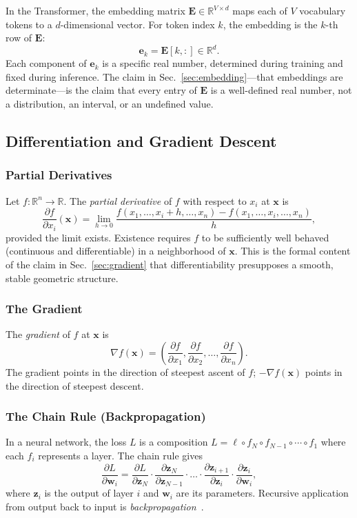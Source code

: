 \documentclass[a4paper,twocolumn,11pt]{article}
\begin{document}
In the Transformer, the embedding matrix $\mathbf{E} \in \mathbb{R}^{V \times d}$ maps each of $V$ vocabulary tokens to a $d$-dimensional vector. For token index $k$, the embedding is the $k$-th row of $\mathbf{E}$:
\[
\mathbf{e}_k = \mathbf{E}[k, :] \in \mathbb{R}^d.
\]
Each component of $\mathbf{e}_k$ is a specific real number, determined during training and fixed during inference. The claim in Sec.~\ref{sec:embedding}---that embeddings are determinate---is the claim that every entry of $\mathbf{E}$ is a well-defined real number, not a distribution, an interval, or an undefined value.

\subsection{Differentiation and Gradient Descent}
\label{sec:A2}

\subsubsection*{Partial Derivatives}

Let $f : \mathbb{R}^n \to \mathbb{R}$. The \emph{partial derivative} of $f$ with respect to $x_i$ at $\mathbf{x}$ is
\[
\frac{\partial f}{\partial x_i}(\mathbf{x}) = \lim_{h \to 0} \frac{f(x_1, \ldots, x_i + h, \ldots, x_n) - f(x_1, \ldots, x_i, \ldots, x_n)}{h},
\]
provided the limit exists. Existence requires $f$ to be sufficiently well behaved (continuous and differentiable) in a neighborhood of $\mathbf{x}$. This is the formal content of the claim in Sec.~\ref{sec:gradient} that differentiability presupposes a smooth, stable geometric structure.

\subsubsection*{The Gradient}

The \emph{gradient} of $f$ at $\mathbf{x}$ is
\[
\nabla f(\mathbf{x}) = \left( \frac{\partial f}{\partial x_1}, \frac{\partial f}{\partial x_2}, \ldots, \frac{\partial f}{\partial x_n} \right).
\]
The gradient points in the direction of steepest ascent of $f$; $-\nabla f(\mathbf{x})$ points in the direction of steepest descent.

\subsubsection*{The Chain Rule (Backpropagation)}

In a neural network, the loss $L$ is a composition $L = \ell \circ f_N \circ f_{N-1} \circ \cdots \circ f_1$ where each $f_i$ represents a layer. The chain rule gives
\[
\frac{\partial L}{\partial \mathbf{w}_i} = \frac{\partial L}{\partial \mathbf{z}_N} \cdot \frac{\partial \mathbf{z}_N}{\partial \mathbf{z}_{N-1}} \cdot \ldots \cdot \frac{\partial \mathbf{z}_{i+1}}{\partial \mathbf{z}_i} \cdot \frac{\partial \mathbf{z}_i}{\partial \mathbf{w}_i},
\]
where $\mathbf{z}_i$ is the output of layer $i$ and $\mathbf{w}_i$ are its parameters. Recursive application from output back to input is \emph{backpropagation}~\cite{RumelhartHinton1986}.
\end{document}
